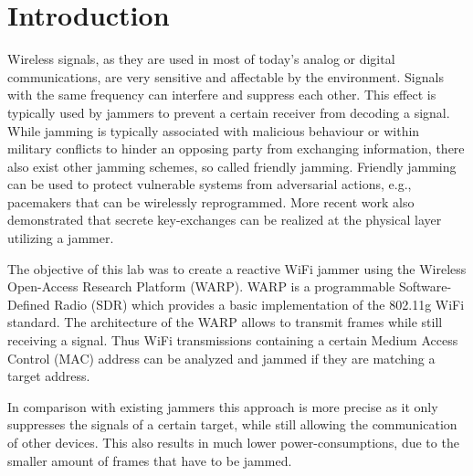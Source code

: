 \documentclass[sigconf]{acmart}
\begin{document}
\maketitle

\section{Introduction}
Wireless signals, as they are used in most of today's analog or digital communications, are very
sensitive and affectable by the environment. Signals with the same frequency can interfere and
suppress each other. This effect is typically used by jammers to prevent a certain receiver from
decoding a signal. While jamming is typically associated with malicious behaviour or within military
conflicts to hinder an opposing party from exchanging information, there also exist other jamming
schemes, so called friendly jamming. Friendly jamming can be used to protect vulnerable systems from
adversarial actions, e.g., pacemakers that can be wirelessly reprogrammed. More recent work also
demonstrated that secrete key-exchanges can be realized at the physical layer utilizing a jammer.

The objective of this lab was to create a reactive WiFi jammer using the Wireless Open-Access
Research Platform (WARP). WARP is a programmable Software-Defined Radio (SDR) which provides a basic
implementation of the 802.11g WiFi standard. The architecture of the WARP allows to transmit frames
while still receiving a signal. Thus WiFi transmissions containing a certain Medium Access Control (MAC)
address can be analyzed and jammed if they are matching a target address.

In comparison with existing jammers this approach is more precise as it only suppresses the signals
of a certain target, while still allowing the communication of other devices. This also results in
much lower power-consumptions, due to the smaller amount of frames that have to be jammed.

\end{document}

